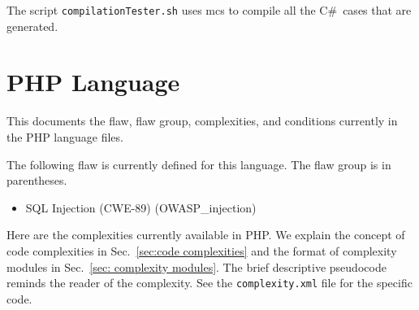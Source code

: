 \documentclass[12pt]{article}
\newcommand{\CSharp}{C{\fontseries{b}\selectfont\#}}
\begin{document}
The script \verb|compilationTester.sh| uses mcs to compile all the
\CSharp\ cases that are generated.

\section{PHP Language}
\label{sec:PHP language}

This documents the flaw, flaw group, complexities, and conditions currently in the
PHP language files.

The following flaw is currently defined for this language.  The flaw group is in
parentheses.
\begin{itemize}
    \item SQL Injection (CWE-89) (OWASP\_injection)
\end{itemize}

\newpage

Here are the complexities currently available in PHP.
We explain the concept of code complexities in Sec.~\ref{sec:code complexities} and
the format of complexity modules in Sec.~\ref{sec: complexity modules}.
The brief descriptive pseudocode reminds the reader of the complexity.
See the \verb|complexity.xml| file for the specific code.
\end{document}
